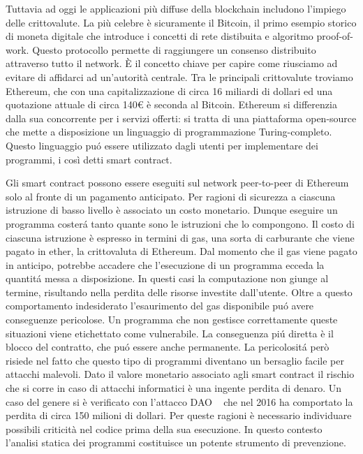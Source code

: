 
\indent Tuttavia ad oggi le applicazioni più diffuse della blockchain includono l'impiego delle crittovalute. La più celebre è sicuramente il Bitcoin, il primo esempio storico di moneta digitale che introduce i concetti di rete distibuita e algoritmo proof-of-work. Questo protocollo permette di raggiungere un consenso distribuito attraverso tutto il network. \`E il concetto chiave per capire come riusciamo ad evitare di affidarci ad un'autorità centrale.\newline
\indent Tra le principali crittovalute troviamo Ethereum, che con una capitalizzazione di circa 16 miliardi di dollari ed una quotazione attuale di circa 140\euro{} è seconda al Bitcoin. Ethereum si differenzia dalla sua concorrente per i servizi offerti: si tratta di una piattaforma open-source che mette a disposizione un linguaggio di programmazione Turing-completo. Questo linguaggio puó essere utilizzato dagli utenti per implementare dei programmi, i così detti smart contract.\newline

\indent Gli smart contract possono essere eseguiti sul network peer-to-peer di Ethereum solo al fronte di un pagamento anticipato. Per ragioni di sicurezza a ciascuna istruzione di basso livello è associato un costo monetario. Dunque eseguire un programma costerá tanto quante sono le istruzioni che lo compongono. Il costo di ciascuna istruzione è espresso in termini di gas, una sorta di carburante che viene pagato in ether, la crittovaluta di Ethereum. Dal momento che il gas viene pagato in anticipo, potrebbe accadere che l'esecuzione di un programma ecceda la quantitá messa a disposizione. In questi casi la computazione non giunge al termine, risultando nella perdita delle risorse investite dall'utente. Oltre a questo comportamento indesiderato l'esaurimento del gas disponibile puó avere conseguenze pericolose. Un programma che non gestisce correttamente queste situazioni viene etichettato come vulnerabile. La conseguenza piú diretta è il blocco del contratto, che puó essere anche permanente. La pericolositá però risiede nel fatto che questo tipo di programmi diventano un bersaglio facile per attacchi malevoli. Dato il valore monetario associato agli smart contract il rischio che si corre in caso di attacchi informatici è una ingente perdita di denaro. Un caso del genere si è verificato con l'attacco DAO ~\cite{daian2016dao} che nel 2016 ha comportato la perdita di circa 150 milioni di dollari.\newline 
\indent Per queste ragioni è necessario individuare possibili criticità nel codice prima della sua esecuzione. In questo contesto l'analisi statica dei programmi costituisce un potente strumento di prevenzione.\newline

